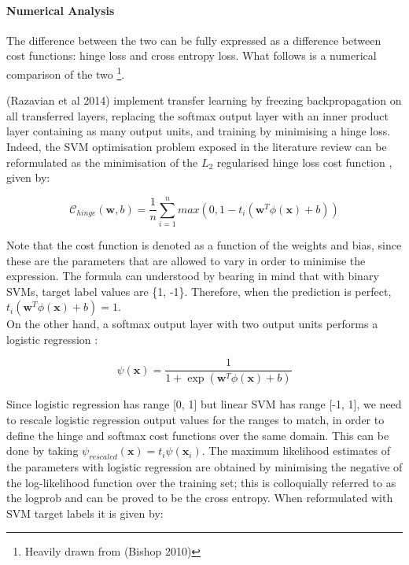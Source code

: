 \documentclass[a4paper,11pt]{article}
\begin{document}
\paragraph{Numerical Analysis}
The difference between the two can be fully expressed as a difference between cost functions\cite{ML-book}: hinge loss and cross entropy loss. What follows is a numerical comparison of the two \footnote{Heavily drawn from (Bishop 2010)}. 

(Razavian et al 2014) implement transfer learning by freezing backpropagation on all transferred layers, replacing the softmax output layer with an inner product layer containing as many output units, and training by minimising a hinge loss. Indeed, the SVM optimisation problem exposed in the literature review can be reformulated as the minimisation of the $L_2$ regularised hinge loss cost function \cite{ML-book}, given by:

\begin{equation}
\mathcal{C}_{hinge}(\textbf{w}, b) = \frac{1}{n}\sum \limits_{i=1}^{n} max(0, 1 - t_i(\textbf{w}^T \phi(\textbf{x}) + b))
\end{equation}

Note that the cost function is denoted as a function of the weights and bias, since these are the parameters that are allowed to vary in order to minimise the expression. The formula can understood by bearing in mind that with binary SVMs, target label values are \{1, -1\}. Therefore, when the prediction is perfect, $t_i(\textbf{w}^T \phi(\textbf{x}) + b) = 1$.\\

On the other hand, a softmax output layer with two output units performs a logistic regression \cite{ML-book}:

\begin{equation}
\psi(\textbf{x}) = \frac{1}{1+\exp(\textbf{w}^T \phi(\textbf{x}) + b)}
\end{equation}

Since logistic regression has range [0, 1] but linear SVM has range [-1, 1], we need to rescale logistic regression output values for the ranges to match, in order to define the hinge and softmax cost functions over the same domain. This can be done by taking $\psi_{rescaled}(\textbf{x}) = t_i \psi(\textbf{x}_i)$. The maximum likelihood estimates of the parameters with logistic regression are obtained by minimising the negative of the log-likelihood function over the training set; this is colloquially referred to as the logprob and can be proved to be the cross entropy. When reformulated with SVM target labels it is given by: 
\end{document}
